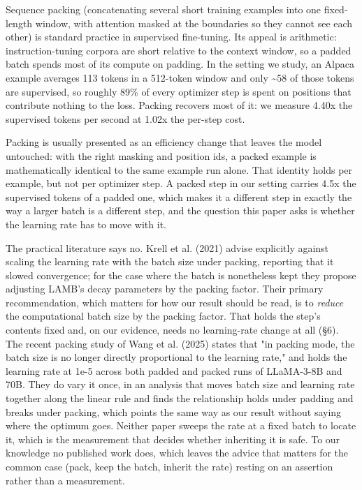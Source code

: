 \documentclass[11pt]{article}
\begin{document}
Sequence packing (concatenating several short training examples into one fixed-length window, with attention masked at the boundaries so they cannot see each other) is standard practice in supervised fine-tuning. Its appeal is arithmetic: instruction-tuning corpora are short relative to the context window, so a padded batch spends most of its compute on padding. In the setting we study, an Alpaca example averages 113 tokens in a 512-token window and only \textasciitilde{}58 of those tokens are supervised, so roughly 89\% of every optimizer step is spent on positions that contribute nothing to the loss. Packing recovers most of it: we measure 4.40x the supervised tokens per second at 1.02x the per-step cost.

Packing is usually presented as an efficiency change that leaves the model untouched: with the right masking and position ids, a packed example is mathematically identical to the same example run alone. That identity holds per example, but not per optimizer step. A packed step in our setting carries 4.5x the supervised tokens of a padded one, which makes it a different step in exactly the way a larger batch is a different step, and the question this paper asks is whether the learning rate has to move with it.

The practical literature says no. Krell et al. (2021) advise explicitly against scaling the learning rate with the batch size under packing, reporting that it slowed convergence; for the case where the batch is nonetheless kept they propose adjusting LAMB's decay parameters by the packing factor. Their primary recommendation, which matters for how our result should be read, is to \emph{reduce} the computational batch size by the packing factor. That holds the step's contents fixed and, on our evidence, needs no learning-rate change at all (\S{}6). The recent packing study of Wang et al. (2025) states that "in packing mode, the batch size is no longer directly proportional to the learning rate," and holds the learning rate at 1e-5 across both padded and packed runs of LLaMA-3-8B and 70B. They do vary it once, in an analysis that moves batch size and learning rate together along the linear rule and finds the relationship holds under padding and breaks under packing, which points the same way as our result without saying where the optimum goes. Neither paper sweeps the rate at a fixed batch to locate it, which is the measurement that decides whether inheriting it is safe. To our knowledge no published work does, which leaves the advice that matters for the common case (pack, keep the batch, inherit the rate) resting on an assertion rather than a measurement.
\end{document}
